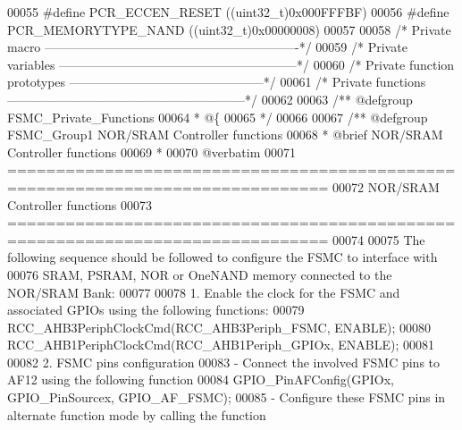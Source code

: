 \begin{DoxyCode}
00055 \textcolor{preprocessor}{#}\textcolor{preprocessor}{define} \textcolor{preprocessor}{PCR\_ECCEN\_RESET}        \textcolor{preprocessor}{(}\textcolor{preprocessor}{(}\textcolor{preprocessor}{uint32\_t}\textcolor{preprocessor}{)}0x000FFFBF\textcolor{preprocessor}{)}
00056 \textcolor{preprocessor}{#}\textcolor{preprocessor}{define} \textcolor{preprocessor}{PCR\_MEMORYTYPE\_NAND}    \textcolor{preprocessor}{(}\textcolor{preprocessor}{(}\textcolor{preprocessor}{uint32\_t}\textcolor{preprocessor}{)}0x00000008\textcolor{preprocessor}{)}
00057 
00058 \textcolor{comment}{/* Private macro -------------------------------------------------------------*/}
00059 \textcolor{comment}{/* Private variables ---------------------------------------------------------*/}
00060 \textcolor{comment}{/* Private function prototypes -----------------------------------------------*/}
00061 \textcolor{comment}{/* Private functions ---------------------------------------------------------*/}
00062 
00063 \textcolor{comment}{/** @defgroup FSMC\_Private\_Functions}
00064 \textcolor{comment}{  * @\{}
00065 \textcolor{comment}{  */}
00066 
00067 \textcolor{comment}{/** @defgroup FSMC\_Group1 NOR/SRAM Controller functions}
00068 \textcolor{comment}{ *  @brief   NOR/SRAM Controller functions }
00069 \textcolor{comment}{ *}
00070 \textcolor{comment}{@verbatim   }
00071 \textcolor{comment}{ ===============================================================================}
00072 \textcolor{comment}{                    NOR/SRAM Controller functions}
00073 \textcolor{comment}{ ===============================================================================  }
00074 \textcolor{comment}{}
00075 \textcolor{comment}{ The following sequence should be followed to configure the FSMC to interface with}
00076 \textcolor{comment}{ SRAM, PSRAM, NOR or OneNAND memory connected to the NOR/SRAM Bank:}
00077 \textcolor{comment}{ }
00078 \textcolor{comment}{   1. Enable the clock for the FSMC and associated GPIOs using the following functions:}
00079 \textcolor{comment}{          RCC\_AHB3PeriphClockCmd(RCC\_AHB3Periph\_FSMC, ENABLE);}
00080 \textcolor{comment}{          RCC\_AHB1PeriphClockCmd(RCC\_AHB1Periph\_GPIOx, ENABLE);}
00081 \textcolor{comment}{}
00082 \textcolor{comment}{   2. FSMC pins configuration }
00083 \textcolor{comment}{       - Connect the involved FSMC pins to AF12 using the following function }
00084 \textcolor{comment}{          GPIO\_PinAFConfig(GPIOx, GPIO\_PinSourcex, GPIO\_AF\_FSMC); }
00085 \textcolor{comment}{       - Configure these FSMC pins in alternate function mode by calling the function}

\end{DoxyCode}
